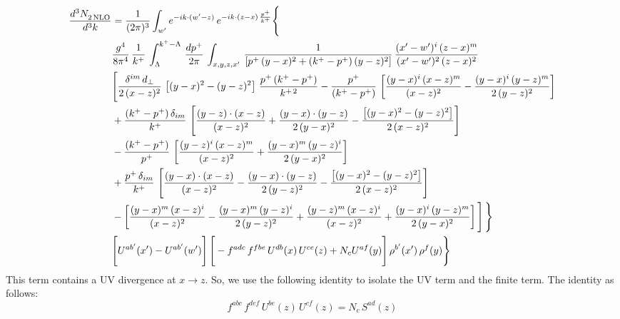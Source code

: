 \documentclass[9pt]{article}
\numberwithin{equation}{section}
\begin{document}
\begin{align}
    \frac{d^{3}N_{2\,\rm NLO}^{\rm}}{d^{3}k}  & =  \frac{1}{(2\pi)^{3}}  \int_{ w^\prime} e^{-ik\cdot(w'-z)}\,e^{-ik\cdot (z-x)\,\frac{p^{+}}{k^{+}}} \Bigg\{\notag \\ & \frac{g^{4}}{8\pi^{4}}\,\frac{1}{k^{+}}\,\int_{\Lambda}^{k^{+}-\Lambda}\, \frac{dp^{+}}{2\pi} \, \int_{x,y,z,x'}\,\frac{1}{\left[p^{+}\,(y-x)^{2}+(k^{+}-p^{+})\,(y-z)^{2}\right]}\, \frac{(x'-w')^{i}\,(z-x)^{m}}{(x'-w')^{2}\,(z-x)^{2}} \notag \\ & \Bigg[\frac{\delta^{im}\,d_{\perp}}{2\,(x-z)^{2}}\,\left[(y-x)^{2}-(y-z)^{2}\right]\,\frac{p^{+}\,(k^{+}-p^{+})}{k^{+\,2}}-\frac{p^{+}}{(k^{+}-p^{+})}\,\left[\frac{(y-x)^{i}\,(x-z)^{m}}{(x-z)^{2}}-\frac{(y-x)^{i}\,(y-z)^{m}}{2\,(y-z)^{2}}\right]\notag \\ & +\frac{(k^{+}-p^{+})\,\delta_{im}}{k^{+}}\,\left[\frac{(y-z)\cdot (x-z)}{(x-z)^{2}}+\frac{(y-x)\cdot (y-z)}{2\,(y-x)^{2}}-\frac{\left[(y-x)^{2}-(y-z)^{2}\right]}{2\,(x-z)^{2}}\right]\notag \\ & -\frac{(k^{+}-p^{+})}{p^{+}}\,\left[\frac{(y-z)^{i}\,(x-z)^{m}}{(x-z)^{2}}+\frac{(y-x)^{m}\,(y-z)^{i}}{2\,(y-x)^{2}}\right]\notag \\ & +\frac{p^{+}\,\delta_{im}}{k^{+}}\,\left[\frac{(y-x)\cdot (x-z)}{(x-z)^{2}}-\frac{(y-x)\cdot (y-z)}{2\,(y-z)^{2}}-\frac{\left[(y-x)^{2}-(y-z)^{2}\right]}{2\,(x-z)^{2}}\right]\notag \\ &-\left[\frac{(y-x)^{m}\,(x-z)^{i}}{(x-z)^{2}}-\frac{(y-x)^{m}\,(y-z)^{i}}{2\,(y-z)^{2}}+\frac{(y-z)^{m}\,(x-z)^{i}}{(x-z)^{2}}+\frac{(y-x)^{i}\,(y-z)^{m}}{2\,(y-x)^{2}}\right]\Bigg]\,\Bigg\} \notag \\ & \Bigg[U^{ab'}(x')-U^{ab'}(w')\Bigg]\,\Bigg[-f^{adc}\,f^{fbe}\,U^{db}(x)\,U^{ce}(z)+N_{c}U^{af}(y)\Bigg]\,\rho^{b'}(x')\,\rho^{f}(y)\Bigg\}
\end{align}
This term contains a UV divergence at $x\rightarrow z$.  So, we use the following identity to isolate the UV term and the finite term. The identity as follows:
$$f^{abc}\,f^{def}\,U^{be}(z)\,U^{cf}(z) = N_{c}\,S^{ad}(z)$$
\end{document}
